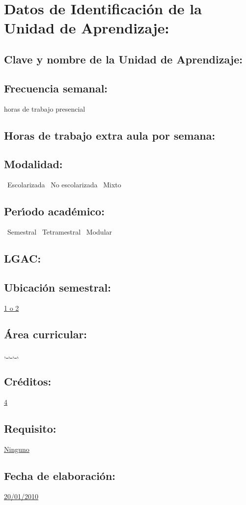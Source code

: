 \documentclass[10 pt]{article}
\begin{document}

\section{Datos de Identificaci\'{o}n de la Unidad de Aprendizaje:}
\subsection{Clave y nombre de la Unidad de Aprendizaje:} 
\subsection{Frecuencia semanal:} horas de trabajo presencial 
\subsection{Horas de trabajo extra aula por semana:} 
\subsection{Modalidad:} \yes~Escolarizada \no~No escolarizada \no~Mixto
\subsection{Per\'{\i}odo acad\'{e}mico:} \yes~Semestral
\no~Tetramestral \no~Modular
\subsection{LGAC:} \underline{\seys}
\subsection{Ubicaci\'{o}n semestral:} \underline{1 o 2}
\subsection{\'{A}rea curricular:} \underline{\fb, \fa, \da, \le, \inv}
\subsection{Cr\'{e}ditos:} \underline{4}
\subsection{Requisito:} \underline{Ninguno}
\subsection{Fecha de elaboraci\'{o}n:} \underline{20/01/2010}
\end{document}

